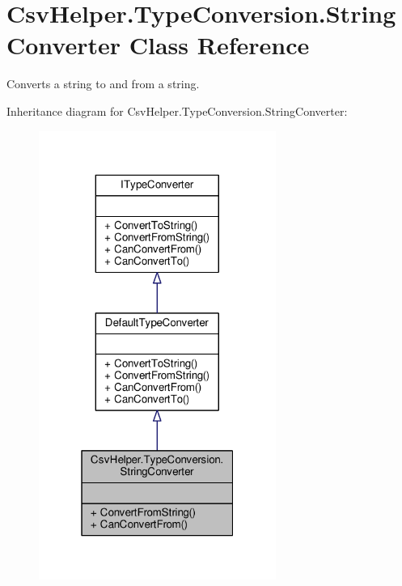 \hypertarget{a00149}{\section{Csv\-Helper.\-Type\-Conversion.\-String\-Converter Class Reference}
\label{a00149}
}


Converts a string to and from a string.  




Inheritance diagram for Csv\-Helper.\-Type\-Conversion.\-String\-Converter\-:
\nopagebreak
\begin{figure}[H]
\begin{center}
\leavevmode
\includegraphics[width=220pt]{a00537}
\end{center}
\end{figure}


